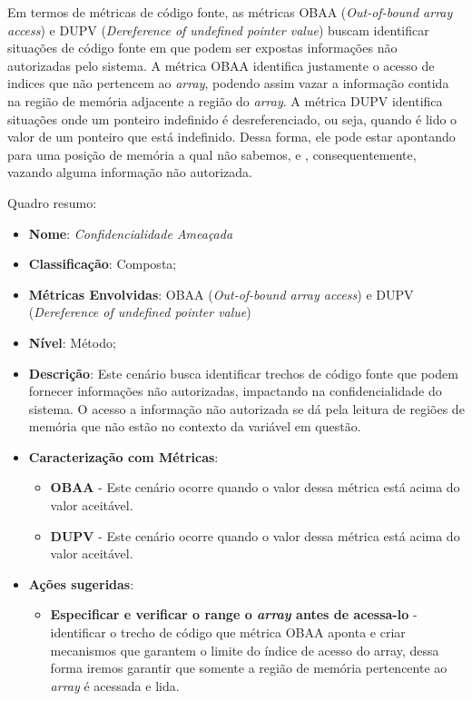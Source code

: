 Em termos de métricas de código fonte, as métricas OBAA (\emph{Out-of-bound array access}) e DUPV (\emph{Dereference of undefined pointer value}) buscam identificar situações de código fonte em que podem ser expostas informações não autorizadas pelo sistema. A métrica OBAA identifica justamente o acesso de indices que não pertencem ao \emph{array}, podendo assim vazar a informação contida na região de memória adjacente a região do \emph{array}. A métrica DUPV identifica situações onde um ponteiro indefinido é desreferenciado, ou seja, quando é lido o valor de um ponteiro que está indefinido. Dessa forma, ele pode estar apontando para uma posição de memória a qual não sabemos, e , consequentemente, vazando alguma informação não autorizada. 

Quadro resumo:

\begin{itemize}
\item \textbf{Nome}: \emph{Confidencialidade Ameaçada}
\item \textbf{Classificação}: Composta;
\item \textbf{Métricas Envolvidas}: OBAA (\emph{Out-of-bound array access}) e DUPV (\emph{Dereference of undefined pointer value}) 
\item \textbf{Nível}: Método;
\item \textbf{Descrição}: Este cenário busca identificar trechos de código fonte que podem fornecer informações não autorizadas, impactando na confidencialidade do sistema. O acesso a informação não autorizada se dá pela leitura de regiões de memória que não estão no contexto da variável em questão.
\item \textbf{Caracterização com Métricas}: 
	\begin{itemize}
	\item \textbf{OBAA} - Este cenário ocorre quando o valor dessa métrica está acima do valor aceitável.
	\item \textbf{DUPV} - Este cenário ocorre quando o valor dessa métrica está acima do valor aceitável.
	\end{itemize}
\item \textbf{Ações sugeridas}: 
	\begin{itemize}
	\item \textbf{Especificar e verificar o range o \emph{array} antes de acessa-lo} - identificar o trecho de código que métrica OBAA aponta e criar mecanismos que garantem o limite do índice de acesso do array, dessa forma iremos garantir que somente a região de memória pertencente ao \emph{array} é acessada e lida.  
	 
	\end{itemize}
\end{itemize}



